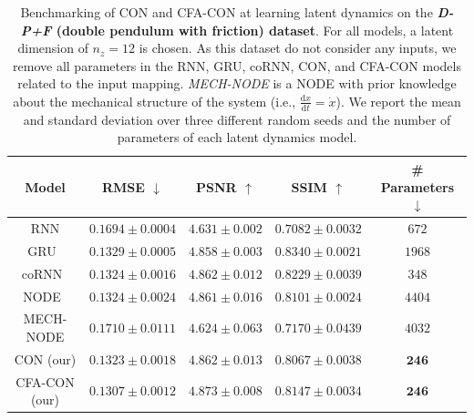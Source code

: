 \begin{table}[ht]
    \centering
    \begin{small}
    \begin{tabular}{c c c c c}
         \toprule
         \textbf{Model} & \textbf{RMSE} $\downarrow$ & \textbf{PSNR} $\uparrow$ & \textbf{SSIM} $\uparrow$ & \textbf{\# Parameters} $\downarrow$ \\
         \midrule
         RNN & $0.1694 \pm 0.0004$ & $4.631 \pm 0.002$ & $0.7082 \pm 0.0032$ & $672$\\
         GRU~\cite{cho2014learning} & $0.1329 \pm 0.0005$ & $4.858 \pm 0.003$ & $\mathbf{0.8340 \pm 0.0021}$ & $1968$\\
         coRNN~\cite{rusch2020coupled} & $0.1324 \pm 0.0016$ & $4.862 \pm 0.012$ & $0.8229 \pm 0.0039$ & $348$\\
         NODE~\cite{chen2018neural} & $0.1324 \pm 0.0024$ & $4.861 \pm 0.016$ & $0.8101 \pm 0.0024$ & $4404$\\
         MECH-NODE & $0.1710 \pm 0.0111$ & $4.624 \pm 0.063$ & $0.7170 \pm 0.0439$ & $4032$\\
         CON (our) & $0.1323 \pm 0.0018$ & $4.862 \pm 0.013$ & $0.8067 \pm 0.0038$ & $\mathbf{246}$\\
         CFA-CON (our) & $\mathbf{0.1307 \pm 0.0012}$ & $\mathbf{4.873 \pm 0.008}$ & $0.8147 \pm 0.0034$ & $\mathbf{246}$\\
         \bottomrule
    \end{tabular}
    \end{small}
    \vspace{0.5cm}
    \caption{Benchmarking of \gls{CON} and \gls{CFA-CON} at learning latent dynamics on the \textbf{\emph{D-P+F} (double pendulum with friction) dataset}. For all models, a latent dimension of $n_z=12$ is chosen. 
    As this dataset do not consider any inputs, we remove all parameters in the RNN, GRU, coRNN, CON, and CFA-CON models related to the input mapping.
    \emph{MECH-NODE} is a \gls{NODE} with prior knowledge about the mechanical structure of the system (i.e., $\frac{\mathrm{d}x}{\mathrm{d}t} = \dot{x}$). We report the mean and standard deviation over three different random seeds and the number of parameters of each latent dynamics model.
    }
    \label{tab:apx-con:latent_dynamics_results:d_p_f}
\end{table}

